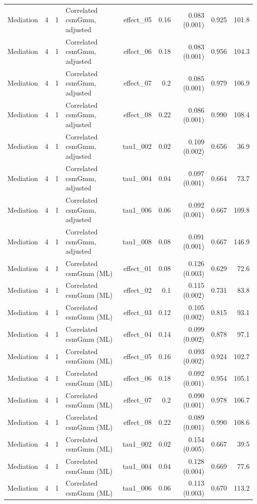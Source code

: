 \begin{longtable}{lcclrrrrr}
Mediation & 4 & 1 & Correlated csmGmm, adjusted & effect\_05 & 0.16 & 0.083 (0.001) & 0.925 & 101.8\\
Mediation & 4 & 1 & Correlated csmGmm, adjusted & effect\_06 & 0.18 & 0.083 (0.001) & 0.956 & 104.3\\
Mediation & 4 & 1 & Correlated csmGmm, adjusted & effect\_07 & 0.2 & 0.085 (0.001) & 0.979 & 106.9\\
Mediation & 4 & 1 & Correlated csmGmm, adjusted & effect\_08 & 0.22 & 0.086 (0.001) & 0.990 & 108.4\\
Mediation & 4 & 1 & Correlated csmGmm, adjusted & tau1\_002 & 0.02 & 0.109 (0.002) & 0.656 & 36.9\\
Mediation & 4 & 1 & Correlated csmGmm, adjusted & tau1\_004 & 0.04 & 0.097 (0.001) & 0.664 & 73.7\\
Mediation & 4 & 1 & Correlated csmGmm, adjusted & tau1\_006 & 0.06 & 0.092 (0.001) & 0.667 & 109.8\\
Mediation & 4 & 1 & Correlated csmGmm, adjusted & tau1\_008 & 0.08 & 0.091 (0.001) & 0.667 & 146.9\\
Mediation & 4 & 1 & Correlated csmGmm (ML) & effect\_01 & 0.08 & 0.126 (0.003) & 0.629 & 72.6\\
Mediation & 4 & 1 & Correlated csmGmm (ML) & effect\_02 & 0.1 & 0.115 (0.002) & 0.731 & 83.8\\
Mediation & 4 & 1 & Correlated csmGmm (ML) & effect\_03 & 0.12 & 0.105 (0.002) & 0.815 & 93.1\\
Mediation & 4 & 1 & Correlated csmGmm (ML) & effect\_04 & 0.14 & 0.099 (0.002) & 0.878 & 97.1\\
Mediation & 4 & 1 & Correlated csmGmm (ML) & effect\_05 & 0.16 & 0.093 (0.002) & 0.924 & 102.7\\
Mediation & 4 & 1 & Correlated csmGmm (ML) & effect\_06 & 0.18 & 0.092 (0.001) & 0.954 & 105.1\\
Mediation & 4 & 1 & Correlated csmGmm (ML) & effect\_07 & 0.2 & 0.090 (0.001) & 0.978 & 106.7\\
Mediation & 4 & 1 & Correlated csmGmm (ML) & effect\_08 & 0.22 & 0.089 (0.001) & 0.990 & 108.6\\
Mediation & 4 & 1 & Correlated csmGmm (ML) & tau1\_002 & 0.02 & 0.154 (0.005) & 0.667 & 39.5\\
Mediation & 4 & 1 & Correlated csmGmm (ML) & tau1\_004 & 0.04 & 0.128 (0.004) & 0.669 & 77.6\\
Mediation & 4 & 1 & Correlated csmGmm (ML) & tau1\_006 & 0.06 & 0.113 (0.003) & 0.670 & 113.2\\

\end{longtable}
